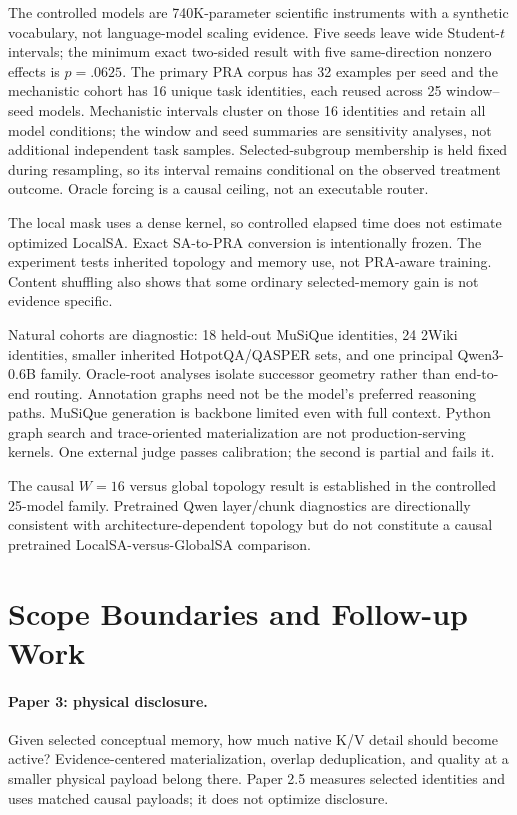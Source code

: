 The controlled models are 740K-parameter scientific instruments with a synthetic vocabulary, not
language-model scaling evidence.  Five seeds leave wide Student-$t$ intervals; the minimum exact
two-sided result with five same-direction nonzero effects is $p=.0625$.  The primary PRA corpus has
32 examples per seed and the mechanistic cohort has 16 unique task identities, each reused across 25
window--seed models.  Mechanistic intervals cluster on those 16 identities and retain all model
conditions; the window and seed summaries are sensitivity analyses, not additional independent task
samples.  Selected-subgroup membership is held fixed during resampling, so its interval remains
conditional on the observed treatment outcome.  Oracle forcing is a causal ceiling, not an executable
router.

The local mask uses a dense kernel, so controlled elapsed time does not estimate optimized LocalSA.
Exact SA-to-PRA conversion is intentionally frozen.  The experiment tests inherited topology and
memory use, not PRA-aware training.  Content shuffling also shows that some ordinary selected-memory
gain is not evidence specific.

Natural cohorts are diagnostic: 18 held-out MuSiQue identities, 24 2Wiki identities, smaller inherited
HotpotQA/QASPER sets, and one principal Qwen3-0.6B family.  Oracle-root analyses isolate successor
geometry rather than end-to-end routing.  Annotation graphs need not be the model's preferred
reasoning paths.  MuSiQue generation is backbone limited even with full context.  Python graph search
and trace-oriented materialization are not production-serving kernels.  One external judge passes
calibration; the second is partial and fails it.

The causal $W=16$ versus global topology result is established in the controlled 25-model family.
Pretrained Qwen layer/chunk diagnostics are directionally consistent with architecture-dependent
topology but do not constitute a causal pretrained LocalSA-versus-GlobalSA comparison.

\section{Scope Boundaries and Follow-up Work}

\paragraph{Paper 3: physical disclosure.}
Given selected conceptual memory, how much native K/V detail should become active?  Evidence-centered
materialization, overlap deduplication, and quality at a smaller physical payload belong there.  Paper
2.5 measures selected identities and uses matched causal payloads; it does not optimize disclosure.

